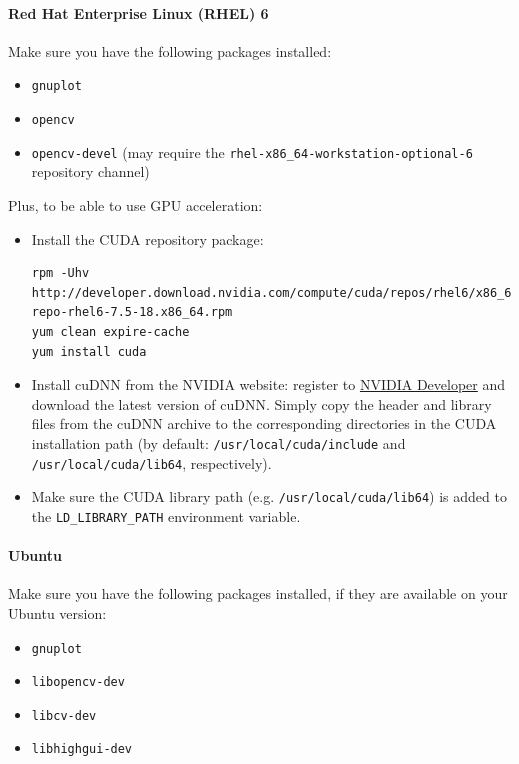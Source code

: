 \documentclass[a4paper,11pt,oneside]{article}
\newenvironment{myitemize}
{ \begin{itemize}
    \setlength{\itemsep}{0pt}
    \setlength{\parskip}{0pt}
    \setlength{\parsep}{0pt}     }
{ \end{itemize}                  }
\begin{document}
\paragraph{Red Hat Enterprise Linux (RHEL) 6}

Make sure you have the following packages installed:
\begin{myitemize}
    \item \lstinline!gnuplot!
    \item \lstinline!opencv!
    \item \lstinline!opencv-devel! (may require the
    \lstinline!rhel-x86_64-workstation-optional-6! repository channel)
\end{myitemize}

Plus, to be able to use GPU acceleration:
\begin{myitemize}
    \item Install the CUDA repository package:
\begin{lstlisting}
rpm -Uhv http://developer.download.nvidia.com/compute/cuda/repos/rhel6/x86_64/cuda-repo-rhel6-7.5-18.x86_64.rpm
yum clean expire-cache
yum install cuda
\end{lstlisting}
    \item Install cuDNN from the NVIDIA website: register to
    \href{https://developer.nvidia.com/cudnn}{NVIDIA Developer} and download
    the latest version of cuDNN.
    Simply copy the header and library files from the cuDNN archive to the
    corresponding directories in the CUDA installation path (by default:
     {\tt{}/usr/local/cuda/include} and {\tt{}/usr/local/cuda/lib64},
     respectively).
    \item Make sure the CUDA library path (e.g. {\tt{}/usr/local/cuda/lib64}) is
     added to the {\tt{}LD\_LIBRARY\_PATH} environment variable.
\end{myitemize}

\paragraph{Ubuntu}

Make sure you have the following packages installed, if they are available on
your Ubuntu version:
\begin{myitemize}
    \item \lstinline!gnuplot!
    \item \lstinline!libopencv-dev!
    \item \lstinline!libcv-dev!
    \item \lstinline!libhighgui-dev!
\end{myitemize}
\end{document}
